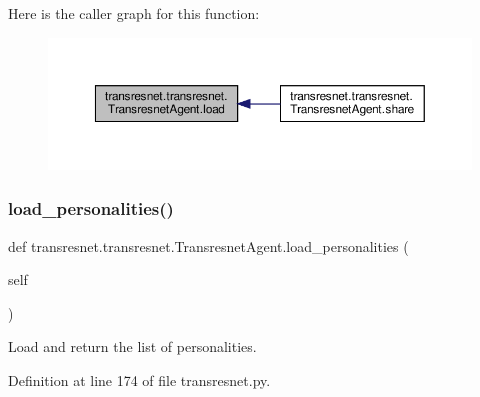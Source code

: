 Here is the caller graph for this function\+:
\nopagebreak
\begin{figure}[H]
\begin{center}
\leavevmode
\includegraphics[width=350pt]{classtransresnet_1_1transresnet_1_1TransresnetAgent_aa2fa1c344748a14803792c3bde4f4c13_icgraph}
\end{center}
\end{figure}
\mbox{\label{classtransresnet_1_1transresnet_1_1TransresnetAgent_a7942a8dde793c66e0280c1b2c88be32a}} 
\subsubsection{\texorpdfstring{load\+\_\+personalities()}{load\_personalities()}}
{\footnotesize\ttfamily def transresnet.\+transresnet.\+Transresnet\+Agent.\+load\+\_\+personalities (\begin{DoxyParamCaption}\item[{}]{self }\end{DoxyParamCaption})}

\begin{DoxyVerb}Load and return the list of personalities.\end{DoxyVerb}
 

Definition at line 174 of file transresnet.\+py.



